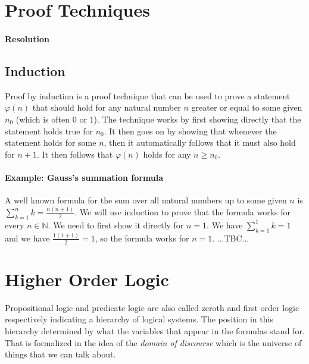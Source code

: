 \section{Proof Techniques}







\paragraph{Resolution}


\subsection{Induction}
Proof by induction is a proof technique that can be used to prove a statement $\varphi(n)$ that should hold for any natural number $n$ greater or equal to some given $n_0$ (which is often $0$ or $1$). The technique works by first showing directly that the statement holds true for $n_0$. It then goes on by showing that whenever the statement holds for some $n$, then it automatically follows that it must also hold for $n+1$. It then follows that $\varphi(n)$ holds for any $n \geq n_0$.

\paragraph{Example: Gauss's summation formula} A well known formula for the sum over all natural numbers up to some given $n$ is $\sum_{k=1}^n k = \frac{n (n+1)}{2}$. We will use induction to prove that the formula works for every $n \in \mathbb{N}$. We need to first show it directly for $n=1$. We have $\sum_{k=1}^1 k = 1$ and we have $\frac{1 (1+1)}{2} = 1$, so the formula works for $n=1$. ...TBC...





\section{Higher Order Logic}
Propositional logic and predicate logic are also called zeroth and first order logic respectively indicating a hierarchy of logical systems. The position in this hierarchy determined by what the variables that appear in the formulas stand for. That is formalized in the idea of the \emph{domain of discourse} which is the universe of things that we can talk about.

